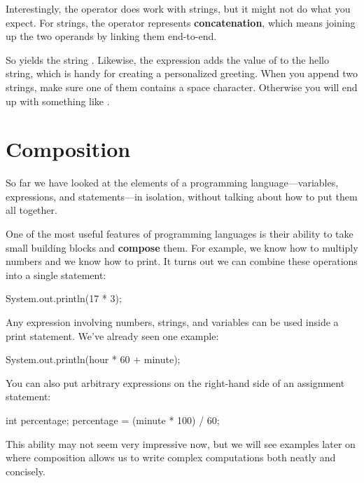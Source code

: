 
Interestingly, the \java{+} operator does work with strings, but it might not do what you expect.
For strings, the \java{+} operator represents {\bf concatenation}, which means joining up the two operands by linking them end-to-end.

So  yields the string .
Likewise, the expression  adds the value of  to the hello string, which is handy for creating a personalized greeting.
When you append two strings, make sure one of them contains a space character.
Otherwise you will end up with something like .


\section{Composition}


So far we have looked at the elements of a programming language---variables, expressions, and statements---in isolation, without talking about how to put them all together.

One of the most useful features of programming languages is their ability to take small building blocks and {\bf compose} them.
For example, we know how to multiply numbers and we know how to print.
It turns out we can combine these operations into a single statement:

\begin{code}
    System.out.println(17 * 3);
\end{code}

Any expression involving numbers, strings, and variables can be used inside a print statement.
We've already seen one example:

\begin{code}
    System.out.println(hour * 60 + minute);
\end{code}

You can also put arbitrary expressions on the right-hand side of an assignment statement:

\begin{code}
    int percentage;
    percentage = (minute * 100) / 60;
\end{code}

This ability may not seem very impressive now, but we will see examples later on where composition allows us to write complex computations both neatly and concisely.

